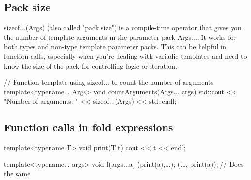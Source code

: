 \documentclass{report}
\begin{document}
     \bigbreak \noindent 
     \subsection{Pack size}
     \bigbreak \noindent 
     sizeof...(Args) (also called "pack size") is a compile-time operator that gives you the number of template arguments in the parameter pack Args.... It works for both types and non-type template parameter packs. This can be helpful in function calls, especially when you're dealing with variadic templates and need to know the size of the pack for controlling logic or iteration.
     \bigbreak \noindent 
     \begin{cppcode}
         // Function template using sizeof... to count the number of arguments
         template<typename... Args>
         void countArguments(Args... args) {
             std::cout << "Number of arguments: " << sizeof...(Args) << std::endl;
         }
     \end{cppcode}

     \pagebreak 
     \subsection{Function calls in fold expressions}
     \bigbreak \noindent 
     \begin{cppcode}
         template<typename T>
         void print(T t) {
             cout << t << endl;
         }

         template<typename... args>
         void f(args...a) {
             (print(a),...);
             (..., print(a)); // Does the same
         }

     \end{cppcode}

     


     \pagebreak \bigbreak \noindent 
\end{document}
